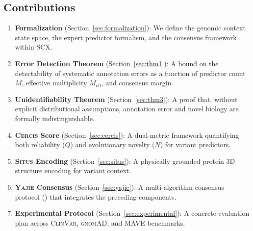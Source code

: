 \documentclass[11pt,a4paper]{article}
\theoremstyle{definition}
\newcommand{\SCX}{\textsc{SCX}}
\newcommand{\situs}{\textsc{Situs}}
\newcommand{\cercis}{\textsc{Cercis}}
\newcommand{\yajie}{\textsc{Yajie}}
\newcommand{\ClinVar}{\textsc{ClinVar}}
\newcommand{\gnomAD}{\textsc{gnomAD}}
\newcommand{\MAVE}{\textsc{MAVE}}
\newcommand{\multiconsensus}{}
\begin{document}
\subsection{Contributions}
\begin{enumerate}[leftmargin=*]
    \item \textbf{Formalization} (Section~\ref{sec:formalization}): We define the genomic context state space, the expert predictor formalism, and the consensus framework within \SCX.
    \item \textbf{Error Detection Theorem} (Section~\ref{sec:thm1}): A bound on the detectability of systematic annotation errors as a function of predictor count $M$, effective multiplicity $M_{\text{eff}}$, and consensus margin.
    \item \textbf{Unidentifiability Theorem} (Section~\ref{sec:thm3}): A proof that, without explicit distributional assumptions, annotation error and novel biology are formally indistinguishable.
    \item \textbf{\cercis{} Score} (Section~\ref{sec:cercis}): A dual-metric framework quantifying both reliability ($Q$) and evolutionary novelty ($N$) for variant predictors.
    \item \textbf{\situs{} Encoding} (Section~\ref{sec:situs}): A physically grounded protein 3D structure encoding for variant context.
    \item \textbf{\yajie{} Consensus} (Section~\ref{sec:yajie}): A multi-algorithm consensus protocol (\multiconsensus{}) that integrates the preceding components.
    \item \textbf{Experimental Protocol} (Section~\ref{sec:experimental}): A concrete evaluation plan across \ClinVar, \gnomAD, and \MAVE{} benchmarks.
\end{enumerate}
\end{document}
